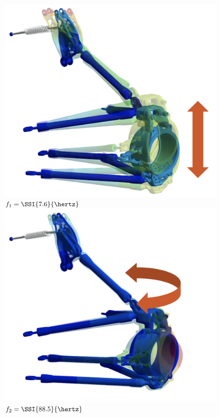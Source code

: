 \begin{figure}[!ht]
  \centering
  \begin{minipage}[c]{0.575\linewidth}
    \small{}
  \end{minipage}
  \begin{minipage}[c]{0.125\linewidth}
    \vspace{-2.5em}
    \begin{center}
      \includegraphics[width=1.0\linewidth]{./figures/chapter_5/mode1.png} \\ \small{$f_1 = \SSI{7.6}{\hertz}$} \\[0.8in]
      \includegraphics[width=1.0\linewidth]{./figures/chapter_5/mode2.png} \\ \small{$f_2 = \SSI{88.5}{\hertz}$} \\[0.8in]

\end{center}
\end{minipage}
\end{figure}
